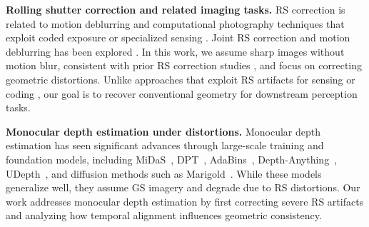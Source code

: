 \vspace{1mm}
\noindent \textbf{Rolling shutter correction and related imaging tasks.}
RS correction is related to motion deblurring and computational photography techniques that exploit coded exposure or specialized sensing \cite{veeraraghavan2010coded, hitomi2011video, wang2015lisens}. Joint RS correction and motion deblurring has been explored \cite{zhong2021towards, seiskari2024gaussian}. In this work, we assume sharp images without motion blur, consistent with prior RS correction studies \cite{Manhattan, RS-Diffusion, DeepUnrollNet}, and focus on correcting geometric distortions. Unlike approaches that exploit RS artifacts for sensing or coding \cite{woo2012vrcodes, o2015homogeneous, wang2018programmable, sheinin2022dual}, our goal is to recover conventional geometry for downstream perception tasks.

\vspace{1mm}
\noindent \textbf{Monocular depth estimation under distortions.}
Monocular depth estimation has seen significant advances through large-scale training and foundation models, including MiDaS~\cite{MIDAS}, DPT~\cite{DPT}, AdaBins~\cite{AdaBins}, Depth-Anything~\cite{DepthAnything}, UDepth~\cite{yu2022udepth}, and diffusion methods such as Marigold~\cite{Marigold}. While these models generalize well, they assume GS imagery and degrade due to RS distortions. Our work addresses monocular depth estimation by first correcting severe RS artifacts and analyzing how temporal alignment influences geometric consistency.